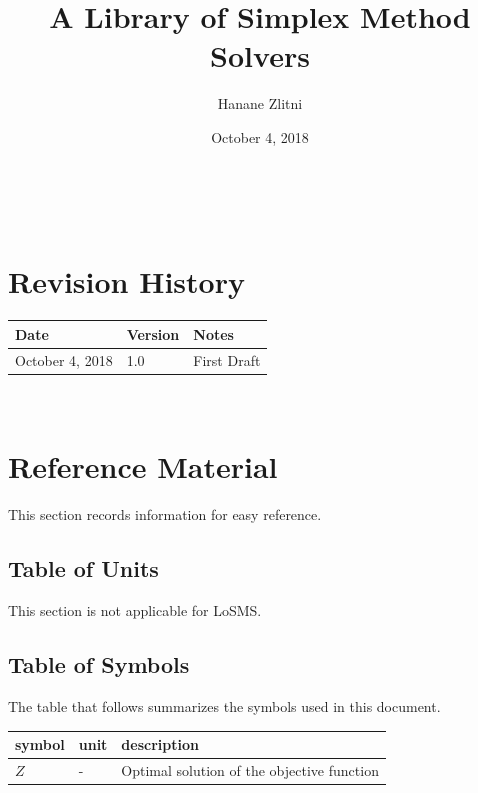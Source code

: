 \documentclass[12pt]{article}
\newcommand{\famname}{LoSMS} %
\begin{document}
\title{A Library of Simplex Method Solvers} 
\author{Hanane Zlitni}
\date{October 4, 2018}

\maketitle

~\newpage


\section{Revision History}

\begin{tabularx}{\textwidth}{p{3cm}p{2cm}X}
	\toprule {\bf Date} & {\bf Version} & {\bf Notes}\\
	\midrule
	October 4, 2018 & 1.0 & First Draft\\
	\bottomrule
\end{tabularx}

~\newpage
	
\section{Reference Material}

This section records information for easy reference.

\subsection{Table of Units}

This section is not applicable for \famname{}.

\subsection{Table of Symbols}

The table that follows summarizes the symbols used in this document.

\renewcommand{\arraystretch}{1.2}
\noindent \begin{longtable*}{l l p{12cm}} \toprule
\textbf{symbol} & \textbf{unit} & \textbf{description}\\
\midrule 
	$Z$ & - & Optimal solution of the objective function\\
\bottomrule
\end{longtable*}
\end{document}
